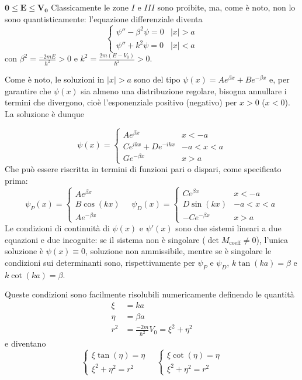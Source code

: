 \item $\mathbf{0\leq E\leq V_0}$
   Classicamente le zone $I$ e $III$ sono proibite, ma, come è noto, non lo sono quantisticamente:
   l'equazione differenziale diventa
   $$
   \begin{cases}
       \psi'' - \beta^2\psi = 0 & |x| >a\\
       \psi'' + k^2\psi = 0 & |x| <a
   \end{cases}
   $$
   con $\beta^2 = \frac{-2mE}{\hbar^2}>0$ e $k^2=\frac{2m(E-V_0)}{\hbar^2}>0$.

   Come è noto, le soluzioni in $|x|>a$ sono del tipo $\psi(x) = Ae^{\beta x}+Be^{-\beta x}$ e, per
   garantire che $\psi(x)$ sia almeno una distribuzione regolare, bisogna annullare i termini che divergono,
   cioè l'esponenziale positivo (negativo) per $x>0$ ($x<0$).
   La soluzione è dunque

   $$
    \psi(x) =
    \begin{cases}
	Ae^{\beta x} & x< -a \\
	Ce^{ikx}+De^{-ikx} & -a<x<a \\
	Ge^{-\beta x} & x>a
    \end{cases}
   $$
Che può essere riscritta in termini di funzioni pari o dispari, come specificato prima:
$$
\psi_P(x) =
    \begin{cases}
	Ae^{\beta x} \\
	B\cos(kx) \\
	Ae^{-\beta x}
    \end{cases}
    \quad
\psi_D(x) = 
    \begin{cases}
	Ce^{\beta x} &x< -a\\
	D\sin(kx) &-a<x<a\\
	-Ce^{-\beta x}&x>a
    \end{cases}
$$
Le condizioni di continuità di $\psi(x)$ e $\psi'(x)$ sono due sistemi lineari a due equazioni e due
incognite: se il sistema non è singolare ($\det M_{\text{coeff}} \neq 0$), l'unica soluzione è $\psi(x)\equiv 0$,
soluzione non ammissibile, mentre se è singolare le condizioni sui determinanti sono, rispettivamente per
$\psi_P$ e $\psi_D$, $k\tan(ka)=\beta$ e $k\cot(ka)=\beta$.

Queste condizioni sono facilmente risolubili numericamente definendo le quantità
\begin{align*}
    \xi &= ka\\
    \eta &= \beta a\\
    r^2 &= \frac{-2m}{\hbar^2}V_0 = \xi^2+\eta^2
\end{align*}
e diventano
$$
\begin{cases}
\xi\tan(\eta) = \eta\\
\xi^2 + \eta^2 = r^2
\end{cases}
\quad
\begin{cases}
\xi\cot(\eta) = \eta\\
\xi^2 + \eta^2 = r^2
\end{cases}
$$

